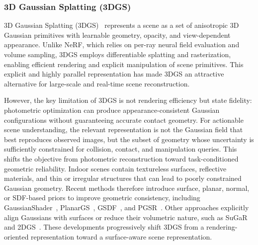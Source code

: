 \documentclass{SCIS2026}
\begin{document}
\subsubsection{3D Gaussian Splatting (3DGS)}

3D Gaussian Splatting (3DGS)~\cite{kerbl20233d} represents a scene as a set of anisotropic 3D Gaussian primitives with learnable geometry, opacity, and view-dependent appearance. Unlike NeRF, which relies on per-ray neural field evaluation and volume sampling, 3DGS employs differentiable splatting and rasterization, enabling efficient rendering and explicit manipulation of scene primitives. This explicit and highly parallel representation has made 3DGS an attractive alternative for large-scale and real-time scene reconstruction.

However, the key limitation of 3DGS is not rendering efficiency but state fidelity: photometric optimization can produce appearance-consistent Gaussian configurations without guaranteeing accurate contact geometry. For actionable scene understanding, the relevant representation is not the Gaussian field that best reproduces observed images, but the subset of geometry whose uncertainty is sufficiently constrained for collision, contact, and manipulation queries. This shifts the objective from photometric reconstruction toward task-conditioned geometric reliability. Indoor scenes contain textureless surfaces, reflective materials, and thin or irregular structures that can lead to poorly constrained Gaussian geometry. Recent methods therefore introduce surface, planar, normal, or SDF-based priors to improve geometric consistency, including GaussianShader~\cite{jiang2024gaussianshader}, PlanarGS~\cite{jin2025planargs}, GSDF~\cite{yu2024gsdf}, and PGSR~\cite{chen2024pgsr}. Other approaches explicitly align Gaussians with surfaces or reduce their volumetric nature, such as SuGaR~\cite{guedon2024sugar} and 2DGS~\cite{huang20242d}. These developments progressively shift 3DGS from a rendering-oriented representation toward a surface-aware scene representation.
\end{document}
